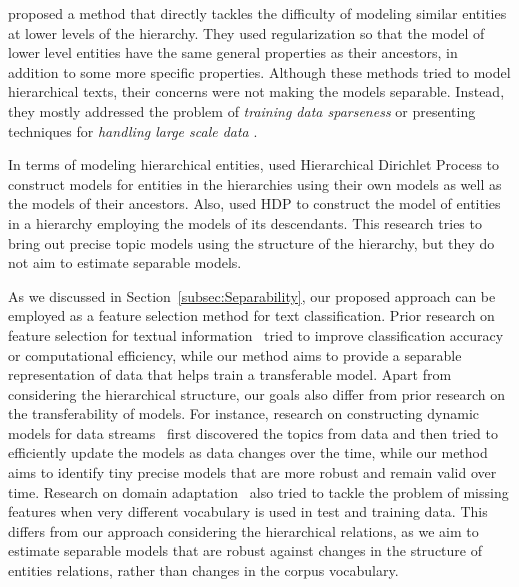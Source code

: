 \citet{Zhou:2011} proposed a method that directly tackles the difficulty of modeling similar entities at lower levels of the hierarchy. They used regularization so that the model of lower level entities have the same general properties as their ancestors, in addition to some more specific properties. 
%
Although these methods tried to model hierarchical texts, their concerns were not making the models separable. Instead, they mostly addressed the problem of \emph{training data sparseness} \cite{Ha-Thuc:2011,Song:2014,McCallum:1998} or presenting techniques for \emph{handling large scale data} \cite{Gopal:2013,Oh:2011,Xue:2008,Ha-Thuc:2011}.

In terms of modeling hierarchical entities, \citet{Kim:2013} used Hierarchical Dirichlet Process \citep{Teh:2006} to construct models for entities in the hierarchies using their own models as well as the models of their ancestors.  Also, \citet{Zavitsanos:2011} used HDP to construct the model of entities in a hierarchy employing the models of its descendants. This research tries to bring out precise topic models using the structure of the hierarchy, but they do not aim to estimate separable models.  

As we discussed in Section~\ref{subsec:Separability}, our proposed approach can be employed as a feature selection method for text classification. Prior research on feature selection for textual information~\citep{SIGIR-Workshop-2010,Forman:2003} tried to improve classification accuracy or computational efficiency, while our method aims to provide a separable representation of data that helps train a transferable model. 
Apart from considering the hierarchical structure, our goals also differ from prior research on the transferability of models. For instance, research on constructing dynamic models for data streams~\citep{Yao:2009,Blei:2006} first discovered the topics from data and then tried to efficiently update the models as data changes over the time, while our method aims to identify tiny precise models that are more robust and remain valid over time.  Research on domain adaptation~\citep{Xue:2008:plsa,Chen:2011} also tried to tackle the problem of missing features when very different vocabulary is used in test and training data.  This differs from our approach considering the hierarchical relations, as we aim to estimate separable models that are robust against changes in the structure of entities relations, rather than changes in the corpus vocabulary.